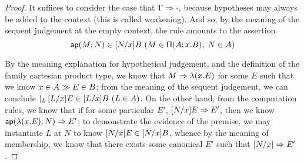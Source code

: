 \documentclass[main.tex]{subfiles}
\begin{document}
\begin{proof}
It suffices to consider the case that $\Gamma\Rightarrow\cdot$,
because hypotheses may always be added to the context (this is called
weakening). And so, by the meaning of the sequent judgement at the
empty context, the rule amounts to the assertion
\[
  \hyp{
    \ver{\ap{M}{N}}{[N/x]B}
  }{
    \ver{M}{\typrod{A}{x}{B}},\; \ver{N}{A}
  }
\]

By the meaning explanation for hypothetical judgement, and the
definition of the family cartesian product type, we know that
$M\Rightarrow\mathsf{\lambda}(x.E)$ for some $E$ such that we know
$x\in A\gg E\in B$; from the meaning of the sequent
judgement, we can conclude $\lvert_{L}\,[L/x]E\in[L/x]B\ (L\in
A)$. On the other hand, from the computation rules, we know that if
for some particular $E'$, $[N/x]E\Rightarrow E'$, then we know
$\mathsf{ap}(\mathsf{\lambda}(x.E);N)\Rightarrow E'$; to demonstrate the evidence of the
premise, we may instantiate $L$ at $N$ to know $[N/x]E\in[N/x]B$,
whence by the meaning of membership, we know that there exists some
canonical $E'$ such that $[N/x]\Rightarrow E'$.
\end{proof}
\end{document}
